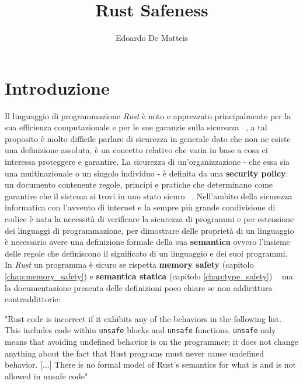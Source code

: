 \documentclass{report}
\title{Rust Safeness}
\author{Edoardo De Matteis}
\begin{document}
\maketitle
\tableofcontents

\clearpage 

\chapter{Introduzione} \label{sec:politica_di_sicurezza}
Il linguaggio di programmazione \textit{Rust} è noto e apprezzato principalmente per la sua efficienza computazionale e per le sue garanzie sulla sicurezza ~\cite[1]{rust:rustonomicon}, a tal proposito è molto difficile parlare di sicurezza in generale dato che non ne esiste una definizione assoluta, è un concetto relativo che varia in base a cosa ci interessa proteggere e garantire. La sicurezza di un'organizzazione - che essa sia una multinazionale o un singolo individuo - è definita da una \textbf{security policy}: un documento contenente regole, principi e pratiche che determinano come garantire che il sistema si trovi in uno stato sicuro ~\cite{milner:type_polymorphism}. Nell'ambito della sicurezza informatica con l'avvento di internet e la sempre più grande condivisione di codice è nata la necessità di verificare la sicurezza di programmi e per estensione dei linguaggi di programmazione, per dimostrare delle proprietà di un linguaggio è necessario avere una definizione formale della sua \textbf{semantica} ovvero l'insieme delle regole che definiscono il significato di un linguaggio e dei suoi programmi. \\
In \textit{Rust} un programma è sicuro se rispetta \textbf{memory safety} (capitolo \ref{chap:memory_safety}) e \textbf{semantica statica} (capitolo \ref{chap:type_safety}) ~\cite[14]{rust:reference} ma la documentazione presenta delle definizioni poco chiare se non addirittura contraddittorie:

\begin{center}
    "Rust code is incorrect if it exhibits any of the behaviors in the following list. This includes code within \colorbox{backcolour}{\texttt{unsafe}} blocks and \colorbox{backcolour}{\texttt{unsafe}} functions. \colorbox{backcolour}{\texttt{unsafe}} only means that avoiding undefined behavior is on the programmer; it does not change anything about the fact that Rust programs must never cause undefined behavior. [...] There is no formal model of Rust's semantics for what is and is not allowed in unsafe code" ~\cite[14.3]{rust:reference}
\end{center}
\end{document}
